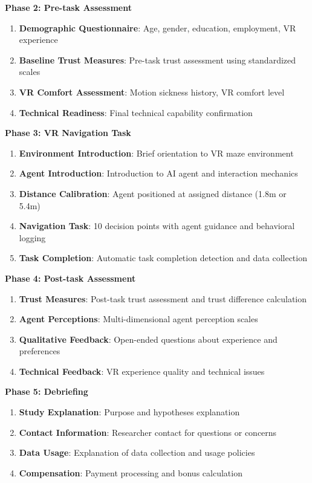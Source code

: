 \documentclass[12pt]{article}
\begin{document}
\textbf{Phase 2: Pre-task Assessment}
\begin{enumerate}
    \item \textbf{Demographic Questionnaire}: Age, gender, education, employment, VR experience
    \item \textbf{Baseline Trust Measures}: Pre-task trust assessment using standardized scales
    \item \textbf{VR Comfort Assessment}: Motion sickness history, VR comfort level
    \item \textbf{Technical Readiness}: Final technical capability confirmation
\end{enumerate}

\textbf{Phase 3: VR Navigation Task}
\begin{enumerate}
    \item \textbf{Environment Introduction}: Brief orientation to VR maze environment
    \item \textbf{Agent Introduction}: Introduction to AI agent and interaction mechanics
    \item \textbf{Distance Calibration}: Agent positioned at assigned distance (1.8m or 5.4m)
    \item \textbf{Navigation Task}: 10 decision points with agent guidance and behavioral logging
    \item \textbf{Task Completion}: Automatic task completion detection and data collection
\end{enumerate}

\textbf{Phase 4: Post-task Assessment}
\begin{enumerate}
    \item \textbf{Trust Measures}: Post-task trust assessment and trust difference calculation
    \item \textbf{Agent Perceptions}: Multi-dimensional agent perception scales
    \item \textbf{Qualitative Feedback}: Open-ended questions about experience and preferences
    \item \textbf{Technical Feedback}: VR experience quality and technical issues
\end{enumerate}

\textbf{Phase 5: Debriefing}
\begin{enumerate}
    \item \textbf{Study Explanation}: Purpose and hypotheses explanation
    \item \textbf{Contact Information}: Researcher contact for questions or concerns
    \item \textbf{Data Usage}: Explanation of data collection and usage policies
    \item \textbf{Compensation}: Payment processing and bonus calculation
\end{enumerate}
\end{document}
